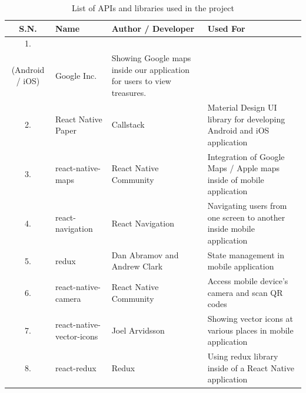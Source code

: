\documentclass[12pt, a4paper, oneside]{article}
\begin{document}
\begin{table}[H]
\begin{tabularx}{\linewidth}{|c|X|X|X|}
\hline
\rowcolor[HTML]{C0C0C0} 
{\color[HTML]{000000} S.N.} & {\color[HTML]{000000} Name}                                               & {\color[HTML]{000000} Author / Developer} & {\color[HTML]{000000} Used For}                                         \\ \hline
1.                          & \begin{tabular}[c]{@{}l@{}}Google Maps SDK\\ (Android / iOS)\end{tabular} & Google Inc.                                            & Showing Google maps inside our application for users to view treasures. \\ \hline
2.                          & React Native Paper                                                        & Callstack                                              & Material Design UI library for developing Android and iOS application   \\ \hline
3.                          & react-native-maps                                                         & React Native Community                                 & Integration of Google Maps / Apple maps inside of mobile application    \\ \hline
4.                          & react-navigation                                                          & React Navigation                                       & Navigating users from one screen to another inside mobile application   \\ \hline
5.                          & redux                                                                     & Dan Abramov and Andrew Clark                           & State management in mobile application                                  \\ \hline
6.                          & react-native-camera                                                       & React Native Community                                 & Access mobile device's camera and scan QR codes                         \\ \hline
7.                          & react-native-vector-icons                                                 & Joel Arvidsson                                         & Showing vector icons at various places in mobile application            \\ \hline
8.                          & react-redux                                                               & Redux                                                  & Using redux library inside of a React Native application                \\ \hline
\end{tabularx}
\caption{List of APIs and libraries used in the project}
\label{table:apiandlibrary}
\end{table}
\end{document}
